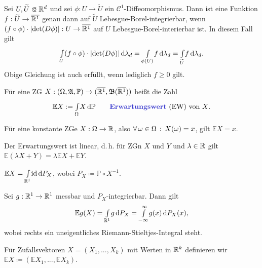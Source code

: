 \documentclass{cheat-sheet}
\newcommand{\Alg}{\mathfrak{A}} %
\renewcommand{\P}{\mathbb{P}} %
\newcommand{\E}{\mathbb{E}} %
\newcommand{\Bor}{\mathfrak{B}} %
\renewcommand{\ER}{\overline{\R^1}} %
\begin{document}

\begin{satz}[Transformationssatz]
  Sei $U, \widetilde{U} \opn \R^d$ und sei $\phi : U \to \widetilde{U}$ ein $\mathcal{C}^1$-Diffeomorphismus. Dann ist eine Funktion $f : \widetilde{U} \to \ER$ genau dann auf $\widetilde{U}$ Lebesgue-Borel-integrierbar, wenn $(f \circ \phi) \cdot \abs{\det(D\phi)} : U \to \ER$ auf $U$ Lebesgue-Borel-interierbar ist. In diesem Fall gilt
  \[ {\textstyle \int\limits_{U}^{}} (f \circ \phi) \cdot \lvert\det(D\phi)\rvert \,\mathrm{d} \lambda_d = {\textstyle \int\limits_{\phi(U)}^{}} f \,\mathrm{d} \lambda_d = {\textstyle \int\limits_{\widetilde{U}}^{}} f \,\mathrm{d} \lambda_d. \]
  Obige Gleichung ist auch erfüllt, wenn lediglich $f \geq 0$ gilt.
\end{satz}

\begin{defn}
  Für eine ZG $X : (\Omega, \Alg, \P) \to (\ER, \Bor(\ER))$ heißt die Zahl
  \[ \E X := \Int{\Omega}{}{X}{\P} \qquad \text{\emph{Erwartungswert} (EW) von $X$.} \]
\end{defn}


\begin{bem}
  Für eine konstante ZGe $X : \Omega \to \mathbb{R}$, also $\forall \, {\omega \in \Omega} \,:\, X(\omega) = x$, gilt $\E X = x$.
\end{bem}

\begin{satz}
  Der Erwartungswert ist linear, d.\,h. für ZGn $X$ und $Y$ und $\lambda \in \mathbb{R}$ gilt $\E (\lambda X + Y) = \lambda \E X + \E Y$.
\end{satz}

\begin{satz}
  $\E X = \Int{\R^1}{}{\id}{P_X}$, wobei $P_X \coloneqq \P \circ X^{-1}$.
\end{satz}

\begin{kor}
  Sei $g : \mathbb{R}^1 \to \mathbb{R}^1$ messbar und $P_X$-integrierbar. Dann gilt
  \[ \E g(X) = \Int{\R^1}{}{g}{P_X} = \Int{-\infty}{\infty}{g(x)}{P_X(x)}, \]
  wobei rechts ein uneigentliches Riemann-Stieltjes-Integral steht.
\end{kor}

\begin{defn}
  Für Zufallsvektoren $X = (X_1, ..., X_k)$ mit Werten in $\mathbb{R}^k$ definieren wir $\E X \coloneqq (\E X_1, ..., \E X_k)$.
\end{defn}
\end{document}
